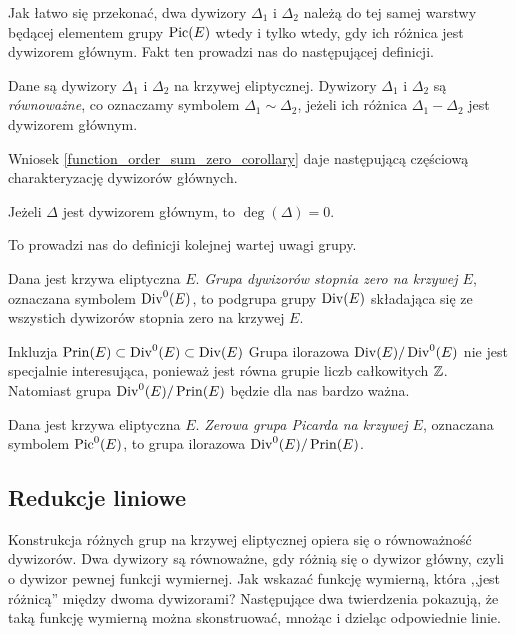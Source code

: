 Jak łatwo się przekonać,
dwa dywizory $\Delta_1$ i $\Delta_2$ należą do tej samej warstwy
będącej elementem grupy $\operatorname{Pic}(E)$
wtedy i tylko wtedy, gdy ich różnica jest dywizorem głównym.
Fakt ten prowadzi nas do następującej definicji.

\begin{definition}
Dane są dywizory $\Delta_1$ i $\Delta_2$ na krzywej eliptycznej.
Dywizory $\Delta_1$ i $\Delta_2$ są \emph{równoważne},
co oznaczamy symbolem $\Delta_1 \sim \Delta_2$,
jeżeli ich różnica $\Delta_1 - \Delta_2$ jest dywizorem głównym.
\end{definition}

Wniosek \ref{function_order_sum_zero_corollary}
daje następującą częściową charakteryzację dywizorów głównych.

\begin{fact}\label{prin_divi_zero_deg_fact}
Jeżeli $\Delta$ jest dywizorem głównym,
to $\deg(\Delta) = 0$.
\end{fact}

To prowadzi nas do definicji kolejnej wartej uwagi grupy.

\begin{definition}
Dana jest krzywa eliptyczna $E$.
\emph{Grupa dywizorów stopnia zero na krzywej $E$},
oznaczana symbolem $\operatorname{Div}^0(E)$,
to podgrupa grupy $\operatorname{Div}(E)$
składająca się ze wszystich dywizorów stopnia zero na krzywej $E$.
\end{definition}

Inkluzja $\operatorname{Prin}(E) \subset \operatorname{Div}^0(E) \subset \operatorname{Div}(E)$
Grupa ilorazowa $\operatorname{Div}(E) / \operatorname{Div}^0(E)$
nie jest specjalnie interesująca,
ponieważ jest równa grupie liczb całkowitych $\mathbb{Z}$.
Natomiast grupa $\operatorname{Div}^0(E) / \operatorname{Prin}(E)$
będzie dla nas bardzo ważna.

\begin{definition}
Dana jest krzywa eliptyczna $E$.
\emph{Zerowa grupa Picarda na krzywej $E$},
oznaczana symbolem $\operatorname{Pic}^0(E)$,
to grupa ilorazowa $\operatorname{Div}^0(E) / \operatorname{Prin}(E)$.
\end{definition}

\subsection*{Redukcje liniowe}

Konstrukcja różnych grup na krzywej eliptycznej opiera się
o równoważność dywizorów. Dwa dywizory są równoważne,
gdy różnią się o dywizor główny, czyli o dywizor pewnej funkcji wymiernej.
Jak wskazać funkcję wymierną, która ,,jest różnicą'' między dwoma dywizorami?
Następujące dwa twierdzenia pokazują, że taką funkcję wymierną
można skonstruować, mnożąc i dzieląc odpowiednie linie.

